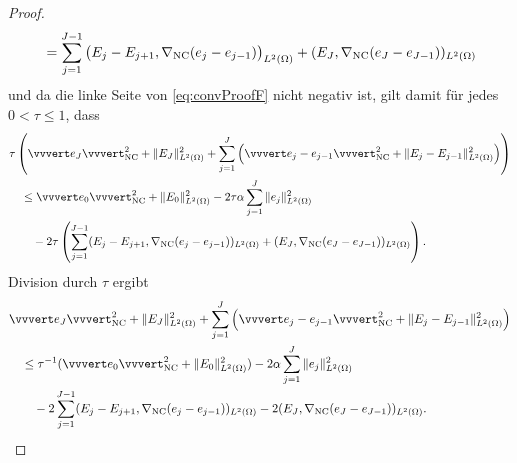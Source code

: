 \begin{proof}
\begin{align*}
    &\quad = 
    \sum_{j=1}^{J-1} 
    \big(E_j-E_{j+1},\nabla_\textup{NC}(e_j-e_{j-1})\big)_{L^2(\Omega)}
    +(E_J,\nabla_\textup{NC}(e_J-e_{J-1}))_{L^2(\Omega)}
  \end{align*}
  und da die linke Seite von
  \eqref{eq:convProofF} nicht negativ ist, gilt damit
  für jedes $0<\tau\leq 1$, dass
  \begin{align*}
    &\tau\left(\vvvert e_J \vvvert^2_\nc +\Vert E_J \Vert_{L^2(\Omega)}^2 
    +\sum_{j=1}^J\left(\vvvert e_j-e_{j-1} \vvvert_\nc^2 + 
    \Vert E_j-E_{j-1}\Vert_{L^2(\Omega)}^2\right)\right) \\
    &\quad \leq 
    \vvvert e_0 \vvvert_\nc^2 + \Vert E_0 \Vert_{L^2(\Omega)}^2 
    -2\tau\alpha\sum_{j=1}^J \Vert e_j\Vert^2_{L^2(\Omega)} \\
    &\quad\quad
    -2\tau\left( 
    \sum_{j=1}^{J-1} 
    (E_j-E_{j+1},\gradnc(e_j-e_{j-1}))_{L^2(\Omega)}
    +(E_J,\gradnc(e_J-e_{J-1}))_{L^2(\Omega)}\right).
  \end{align*}
  Division durch $\tau$ ergibt
  \begin{align}
    \label{eq:convProofG}
    &\vvvert e_J \vvvert^2_\nc +\Vert E_J \Vert_{L^2(\Omega)}^2 
    +\sum_{j=1}^J\left(\vvvert e_j-e_{j-1} \vvvert_\nc^2 + 
    \Vert E_j-E_{j-1}\Vert_{L^2(\Omega)}^2\right) \notag\\
    &\quad \leq 
    \tau^{-1}(\vvvert e_0 \vvvert_\nc^2 + \Vert E_0 \Vert_{L^2(\Omega)}^2 )
    -2\alpha\sum_{j=1}^J \Vert e_j\Vert^2_{L^2(\Omega)} \\
    &\quad\quad
    -2 \sum_{j=1}^{J-1} (E_j-E_{j+1},\gradnc(e_j-e_{j-1}))_{L^2(\Omega)}
    -2(E_J,\gradnc(e_J-e_{J-1}))_{L^2(\Omega)}.\notag
  \end{align}



\end{proof}
